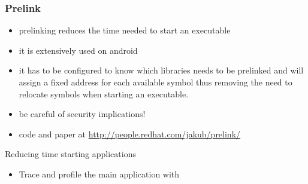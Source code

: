 \begin{frame}
\frametitle{Prelink}
\begin{itemize}
	\item prelinking reduces the time needed to start an executable
	\item it is extensively used on android
	\item it has to be configured to know which libraries needs to be
		prelinked and will assign a fixed address for each available
		symbol thus removing the need to relocate symbols when starting
		an executable.
	\item be careful of security implications!
	\item code and paper at
		\url{http://people.redhat.com/jakub/prelink/}
\end{itemize}
\end{frame}

\setuplabframe
{Reducing time starting applications}
{
\begin{itemize}
\item Trace and profile the main application with 
\end{itemize}
}

